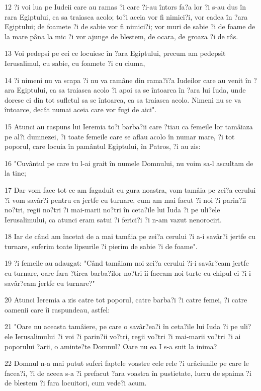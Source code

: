 \par 12 ?i voi lua pe Iudeii care au ramas ?i care ?i-au întors fa?a lor ?i s-au dus în rara Egiptului, ca sa traiasca acolo; to?i aceia vor fi nimici?i, vor cadea în ?ara Egiptului; de foamete ?i de sabie vor fi nimici?i; vor muri de sabie ?i de foame de la mare pâna la mic ?i vor ajunge de blestem, de ocara, de groaza ?i de râs.
\par 13 Voi pedepsi pe cei ce locuiesc în ?ara Egiptului, precum am pedepsit Ierusalimul, cu sabie, cu foamete ?i cu ciuma,
\par 14 ?i nimeni nu va scapa ?i nu va ramâne din rama?i?a Iudeilor care au venit în ?ara Egiptului, ca sa traiasca acolo ?i apoi sa se întoarca în ?ara lui Iuda, unde doresc ei din tot sufletul sa se întoarca, ca sa traiasca acolo. Nimeni nu se va întoarce, decât numai aceia care vor fugi de aici".
\par 15 Atunci au raspuns lui Ieremia to?i barba?ii care ?tiau ca femeile lor tamâiaza pe al?i dumnezei, ?i toate femeile care se aflau acolo în numar mare, ?i tot poporul, care locuia în pamântul Egiptului, în Patros, ?i au zis:
\par 16 "Cuvântul pe care tu l-ai grait în numele Domnului, nu voim sa-l ascultam de la tine;
\par 17 Dar vom face tot ce am fagaduit cu gura noastra, vom tamâia pe zei?a cerului ?i vom savâr?i pentru ea jertfe cu turnare, cum am mai facut ?i noi ?i parin?ii no?tri, regii no?tri ?i mai-marii no?tri în ceta?ile lui Iuda ?i pe uli?ele Ierusalimului, ca atunci eram satui ?i ferici?i ?i n-am vazut nenorociri.
\par 18 Iar de când am încetat de a mai tamâia pe zei?a cerului ?i a-i savâr?i jertfe cu turnare, suferim toate lipsurile ?i pierim de sabie ?i de foame".
\par 19 ?i femeile au adaugat: "Când tamâiam noi zei?a cerului ?i-i savâr?eam jertfe cu turnare, oare fara ?tirea barba?ilor no?tri îi faceam noi turte cu chipul ei ?i-i savâr?eam jertfe cu turnare?"
\par 20 Atunci Ieremia a zis catre tot poporul, catre barba?i ?i catre femei, ?i catre oamenii care îi raspundeau, astfel:
\par 21 "Oare nu aceasta tamâiere, pe care o savâr?ea?i în ceta?ile lui Iuda ?i pe uli?ele Ierusalimului ?i voi ?i parin?ii vo?tri, regii vo?tri ?i mai-marii vo?tri ?i ai poporului ?arii, o aminte?te Domnul? Oare nu ea I s-a suit la inima?
\par 22 Domnul n-a mai putut suferi faptele voastre cele rele ?i urâciunile pe care le facea?i, ?i de aceea s-a ?i prefacut ?ara voastra în pustietate, lucru de spaima ?i de blestem ?i fara locuitori, cum vede?i acum.
